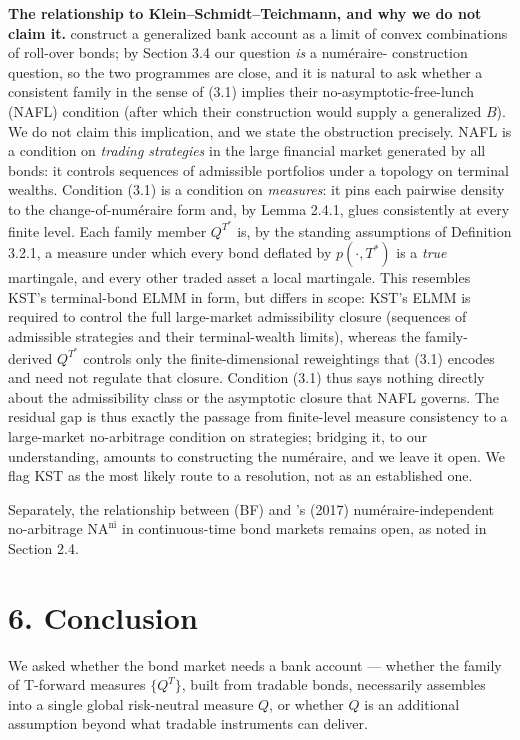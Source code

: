 \documentclass[
]{article}
\begin{document}
\textbf{The relationship to Klein--Schmidt--Teichmann, and why we do not
claim it.} \citet{KleinSchmidtTeichmann2016} construct a generalized
bank account as a limit of convex combinations of roll-over bonds; by
Section 3.4 our question \emph{is} a numéraire- construction question,
so the two programmes are close, and it is natural to ask whether a
consistent family in the sense of (3.1) implies their
no-asymptotic-free-lunch (NAFL) condition (after which their
construction would supply a generalized \(B\)). We do not claim this
implication, and we state the obstruction precisely. NAFL is a condition
on \emph{trading strategies} in the large financial market generated by
all bonds: it controls sequences of admissible portfolios under a
topology on terminal wealths. Condition (3.1) is a condition on
\emph{measures}: it pins each pairwise density to the
change-of-numéraire form and, by Lemma 2.4.1, glues consistently at
every finite level. Each family member \(Q^{T^*}\) is, by the standing
assumptions of Definition 3.2.1, a measure under which every bond
deflated by \(p(\cdot, T^*)\) is a \emph{true} martingale, and every
other traded asset a local martingale. This resembles KST's
terminal-bond ELMM in form, but differs in scope: KST's ELMM is required
to control the full large-market admissibility closure (sequences of
admissible strategies and their terminal-wealth limits), whereas the
family-derived \(Q^{T^*}\) controls only the finite-dimensional
reweightings that (3.1) encodes and need not regulate that closure.
Condition (3.1) thus says nothing directly about the admissibility class
or the asymptotic closure that NAFL governs. The residual gap is thus
exactly the passage from finite-level measure consistency to a
large-market no-arbitrage condition on strategies; bridging it, to our
understanding, amounts to constructing the numéraire, and we leave it
open. We flag KST as the most likely route to a resolution, not as an
established one.

Separately, the relationship between (BF) and \citeauthor{Herdegen2017}'s (2017)
numéraire-independent no-arbitrage \(\text{NA}^{\text{ni}}\) in
continuous-time bond markets remains open, as noted in Section 2.4.

\section{6. Conclusion}\label{conclusion}

We asked whether the bond market needs a bank account --- whether the
family of T-forward measures \(\{Q^T\}\), built from tradable bonds,
necessarily assembles into a single global risk-neutral measure \(Q\),
or whether \(Q\) is an additional assumption beyond what tradable
instruments can deliver.
\end{document}
